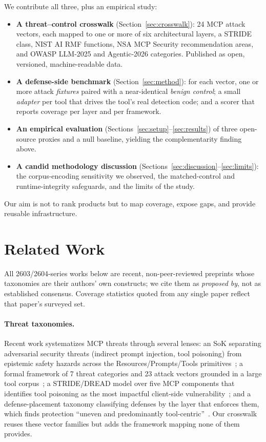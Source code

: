 \documentclass[sigconf,review,anonymous]{acmart}
\begin{document}
We contribute all three, plus an empirical study:
\begin{itemize}
\item \textbf{A threat--control crosswalk} (Section~\ref{sec:crosswalk}): 24 MCP attack vectors, each mapped to one or more of six architectural layers, a STRIDE class, NIST AI RMF functions, NSA MCP Security recommendation areas, and OWASP LLM-2025 and Agentic-2026 categories. Published as open, versioned, machine-readable data.
\item \textbf{A defense-side benchmark} (Section~\ref{sec:method}): for each vector, one or more attack \emph{fixtures} paired with a near-identical \emph{benign control}; a small \emph{adapter} per tool that drives the tool's real detection code; and a scorer that reports coverage per layer and per framework.
\item \textbf{An empirical evaluation} (Sections~\ref{sec:setup}--\ref{sec:results}) of three open-source proxies and a null baseline, yielding the complementarity finding above.
\item \textbf{A candid methodology discussion} (Sections~\ref{sec:discussion}--\ref{sec:limits}): the corpus-encoding sensitivity we observed, the matched-control and runtime-integrity safeguards, and the limits of the study.
\end{itemize}
Our aim is not to rank products but to map coverage, expose gaps, and provide reusable infrastructure.

\section{Related Work}\label{sec:related}
All 2603/2604-series works below are recent, non-peer-reviewed preprints whose taxonomies are their authors' own constructs; we cite them as \emph{proposed by}, not as established consensus. Coverage statistics quoted from any single paper reflect that paper's surveyed set.

\paragraph{Threat taxonomies.} Recent work systematizes MCP threats through several lenses: an SoK separating adversarial security threats (indirect prompt injection, tool poisoning) from epistemic safety hazards across the Resources/Prompts/Tools primitives~\cite{sok2512}; a formal framework of 7 threat categories and 23 attack vectors grounded in a large tool corpus~\cite{formal2604}; a STRIDE/DREAD model over five MCP components that identifies tool poisoning as the most impactful client-side vulnerability~\cite{stride2603}; and a defense-placement taxonomy classifying defenses by the layer that enforces them, which finds protection ``uneven and predominantly tool-centric''~\cite{mcpdpt2604}. Our crosswalk reuses these vector families but adds the framework mapping none of them provides.
\end{document}
